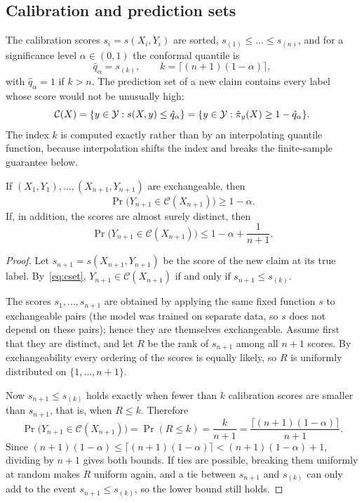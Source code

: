 \subsection{Calibration and prediction sets}

The calibration scores $s_i = s(X_i, Y_i)$ are sorted, $s_{(1)} \le \dots \le s_{(n)}$, and for a significance level $\alpha \in (0,1)$ the conformal quantile is
\begin{equation}
\label{eq:qhat}
  \hat{q}_\alpha = s_{(k)}, \qquad k = \lceil (n+1)(1-\alpha) \rceil,
\end{equation}
with $\hat{q}_\alpha = 1$ if $k > n$. The prediction set of a new claim contains every label whose score would not be unusually high:
\begin{equation}
\label{eq:cset}
  \mathcal{C}(X) = \{ y \in \mathcal{Y} : s(X, y) \le \hat{q}_\alpha \} = \{ y \in \mathcal{Y} : \hat{\pi}_y(X) \ge 1 - \hat{q}_\alpha \}.
\end{equation}
The index $k$ is computed exactly rather than by an interpolating quantile function, because interpolation shifts the index and breaks the finite-sample guarantee below.

\begin{theorem}
\label{thm:coverage}
If $(X_1, Y_1), \dots, (X_{n+1}, Y_{n+1})$ are exchangeable, then
\begin{equation}
  \Pr\bigl( Y_{n+1} \in \mathcal{C}(X_{n+1}) \bigr) \ge 1 - \alpha .
\end{equation}
If, in addition, the scores are almost surely distinct, then
\begin{equation}
  \Pr\bigl( Y_{n+1} \in \mathcal{C}(X_{n+1}) \bigr) \le 1 - \alpha + \frac{1}{n+1}.
\end{equation}
\end{theorem}

\begin{proof}
Let $s_{n+1} = s(X_{n+1}, Y_{n+1})$ be the score of the new claim at its true label. By~\eqref{eq:cset}, $Y_{n+1} \in \mathcal{C}(X_{n+1})$ if and only if $s_{n+1} \le s_{(k)}$.

The scores $s_1, \dots, s_{n+1}$ are obtained by applying the same fixed function $s$ to exchangeable pairs (the model was trained on separate data, so $s$ does not depend on these pairs); hence they are themselves exchangeable. Assume first that they are distinct, and let $R$ be the rank of $s_{n+1}$ among all $n+1$ scores. By exchangeability every ordering of the scores is equally likely, so $R$ is uniformly distributed on $\{1, \dots, n+1\}$.

Now $s_{n+1} \le s_{(k)}$ holds exactly when fewer than $k$ calibration scores are smaller than $s_{n+1}$, that is, when $R \le k$. Therefore
\[
  \Pr\bigl( Y_{n+1} \in \mathcal{C}(X_{n+1}) \bigr) = \Pr(R \le k) = \frac{k}{n+1} = \frac{\lceil (n+1)(1-\alpha) \rceil}{n+1}.
\]
Since $(n+1)(1-\alpha) \le \lceil (n+1)(1-\alpha) \rceil < (n+1)(1-\alpha) + 1$, dividing by $n+1$ gives both bounds. If ties are possible, breaking them uniformly at random makes $R$ uniform again, and a tie between $s_{n+1}$ and $s_{(k)}$ can only add to the event $s_{n+1} \le s_{(k)}$, so the lower bound still holds.
\end{proof}

